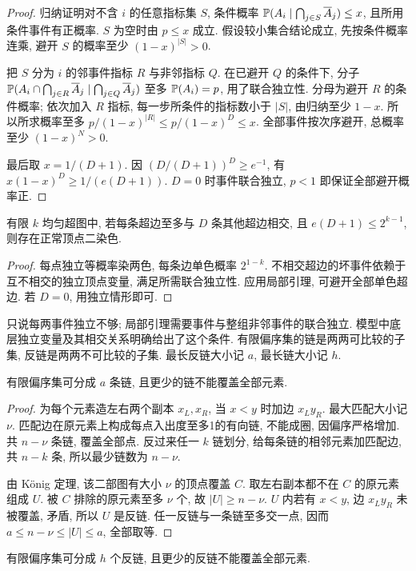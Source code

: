 \begin{proof}
归纳证明对不含 $i$ 的任意指标集 $S$, 条件概率 $\mathbb P(A_i\mid\bigcap_{j\in S}\overline A_j)\le x$, 且所用条件事件有正概率. $S$ 为空时由 $p\le x$ 成立. 假设较小集合结论成立, 先按条件概率连乘, 避开 $S$ 的概率至少 $(1-x)^{|S|}>0$.

把 $S$ 分为 $i$ 的邻事件指标 $R$ 与非邻指标 $Q$. 在已避开 $Q$ 的条件下, 分子 $\mathbb P(A_i\cap\bigcap_{j\in R}\overline A_j\mid\bigcap_{j\in Q}\overline A_j)$ 至多 $\mathbb P(A_i)=p$, 用了联合独立性. 分母为避开 $R$ 的条件概率; 依次加入 $R$ 指标, 每一步所条件的指标数小于 $|S|$, 由归纳至少 $1-x$. 所以所求概率至多 $p/(1-x)^{|R|}\le p/(1-x)^D\le x$. 全部事件按次序避开, 总概率至少 $(1-x)^N>0$.

最后取 $x=1/(D+1)$. 因 $(D/(D+1))^D\ge e^{-1}$, 有 $x(1-x)^D\ge1/(e(D+1))$. $D=0$ 时事件联合独立, $p<1$ 即保证全部避开概率正.
\end{proof}
\begin{corollary}\label{cor:hypergraph}
有限 $k$ 均匀超图中, 若每条超边至多与 $D$ 条其他超边相交, 且 $e(D+1)\le2^{k-1}$, 则存在正常顶点二染色.
\end{corollary}
\begin{proof}
每点独立等概率染两色, 每条边单色概率 $2^{1-k}$. 不相交超边的坏事件依赖于互不相交的独立顶点变量, 满足所需联合独立性. 应用局部引理, 可避开全部单色超边. 若 $D=0$, 用独立情形即可.
\end{proof}
只说每两事件独立不够; 局部引理需要事件与整组非邻事件的联合独立. 模型中底层独立变量及其相交关系明确给出了这个条件.
有限偏序集的链是两两可比较的子集, 反链是两两不可比较的子集. 最长反链大小记 $a$, 最长链大小记 $h$.
\begin{theorem}[Dilworth]\label{thm:dilworth}
有限偏序集可分成 $a$ 条链, 且更少的链不能覆盖全部元素.
\end{theorem}
\begin{proof}
为每个元素造左右两个副本 $x_L,x_R$, 当 $x<y$ 时加边 $x_Ly_R$. 最大匹配大小记 $\nu$. 匹配边在原元素上构成每点入出度至多1的有向链, 不能成圈, 因偏序严格增加. 共 $n-\nu$ 条链, 覆盖全部点. 反过来任一 $k$ 链划分, 给每条链的相邻元素加匹配边, 共 $n-k$ 条, 所以最少链数为 $n-\nu$.

由 König 定理, 该二部图有大小 $\nu$ 的顶点覆盖 $C$. 取左右副本都不在 $C$ 的原元素组成 $U$. 被 $C$ 排除的原元素至多 $\nu$ 个, 故 $|U|\ge n-\nu$. $U$ 内若有 $x<y$, 边 $x_Ly_R$ 未被覆盖, 矛盾, 所以 $U$ 是反链. 任一反链与一条链至多交一点, 因而 $a\le n-\nu\le|U|\le a$, 全部取等.
\end{proof}
\begin{theorem}[Mirsky]\label{thm:mirsky}
有限偏序集可分成 $h$ 个反链, 且更少的反链不能覆盖全部元素.
\end{theorem}
